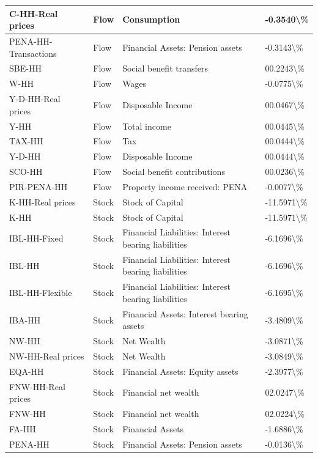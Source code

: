 \documentclass[
]{book}
\begin{document}
\begin{table}
\begin{tabular}[t]{l|l|l|l}
\hline
C-HH-Real prices & Flow & Consumption & -0.3540\textbackslash{}\%\\
\hline
PENA-HH-Transactions & Flow & Financial Assets: Pension assets & -0.3143\textbackslash{}\%\\
\hline
SBE-HH & Flow & Social benefit transfers & 00.2243\textbackslash{}\%\\
\hline
W-HH & Flow & Wages & -0.0775\textbackslash{}\%\\
\hline
Y-D-HH-Real prices & Flow & Disposable Income & 00.0467\textbackslash{}\%\\
\hline
Y-HH & Flow & Total income & 00.0445\textbackslash{}\%\\
\hline
TAX-HH & Flow & Tax & 00.0444\textbackslash{}\%\\
\hline
Y-D-HH & Flow & Disposable Income & 00.0444\textbackslash{}\%\\
\hline
SCO-HH & Flow & Social benefit contributions & 00.0236\textbackslash{}\%\\
\hline
PIR-PENA-HH & Flow & Property income received: PENA & -0.0077\textbackslash{}\%\\
\hline
K-HH-Real prices & Stock & Stock of Capital & -11.5971\textbackslash{}\%\\
\hline
K-HH & Stock & Stock of Capital & -11.5971\textbackslash{}\%\\
\hline
IBL-HH-Fixed & Stock & Financial Liabilities: Interest bearing liabilities & -6.1696\textbackslash{}\%\\
\hline
IBL-HH & Stock & Financial Liabilities: Interest bearing liabilities & -6.1696\textbackslash{}\%\\
\hline
IBL-HH-Flexible & Stock & Financial Liabilities: Interest bearing liabilities & -6.1695\textbackslash{}\%\\
\hline
IBA-HH & Stock & Financial Assets: Interest bearing assets & -3.4809\textbackslash{}\%\\
\hline
NW-HH & Stock & Net Wealth & -3.0871\textbackslash{}\%\\
\hline
NW-HH-Real prices & Stock & Net Wealth & -3.0849\textbackslash{}\%\\
\hline
EQA-HH & Stock & Financial Assets: Equity assets & -2.3977\textbackslash{}\%\\
\hline
FNW-HH-Real prices & Stock & Financial net wealth & 02.0247\textbackslash{}\%\\
\hline
FNW-HH & Stock & Financial net wealth & 02.0224\textbackslash{}\%\\
\hline
FA-HH & Stock & Financial Assets & -1.6886\textbackslash{}\%\\
\hline
PENA-HH & Stock & Financial Assets: Pension assets & -0.0136\textbackslash{}\%\\
\hline
\end{tabular}
\end{table}
\end{document}

